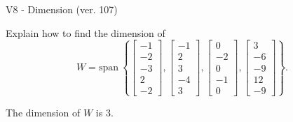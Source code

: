 \begin{exercise}
  \begin{exerciseTitle}V8 - Dimension (ver. 107)\end{exerciseTitle}
  \begin{exerciseStatement}
    Explain how to find the dimension of 
\[W=\mathrm{span}\ \left\{\left[\begin{array}{r}
-1 \\
-2 \\
-3 \\
2 \\
-2
\end{array}\right] , \left[\begin{array}{r}
-1 \\
2 \\
3 \\
-4 \\
3
\end{array}\right] , \left[\begin{array}{r}
0 \\
-2 \\
0 \\
-1 \\
0
\end{array}\right] , \left[\begin{array}{r}
3 \\
-6 \\
-9 \\
12 \\
-9
\end{array}\right]\right\}.\]



  \end{exerciseStatement}
  \begin{exerciseAnswer}
   The dimension of \(W\) is  \(3\).
  


  \end{exerciseAnswer}
\end{exercise}